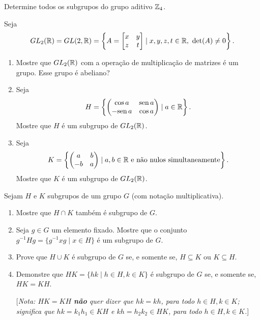 \documentclass[12pt]{exam}
\begin{document}
    \vspace{.3cm}

    \questao{} Determine todos os subgrupos do grupo aditivo $\mathbb{Z}_4$.

    \vspace{.3cm}

    \questao{} Seja
    \[
    	GL_2(\mathbb{R}) = GL(2, \mathbb{R}) = \left\{A = \begin{bmatrix}x & y\\z & t\end{bmatrix} \mid x, y, z, t \in \mathbb{R},\ \det(A) \ne 0 \right\}.
    \]
    \begin{enumerate}[label=({\alph*})]
      \item Mostre que $GL_2(\mathbb{R})$ com a opera\c{c}\~ao de multiplica\c{c}\~ao de matrizes \'e um grupo. Esse grupo \'e abeliano?

      \item Seja
      \[
          H = \left\{ \begin{pmatrix}
              \cos a & {\rm sen\,} a\\ - {\rm sen\,} a & \cos a
          \end{pmatrix} \mid a \in \mathbb{R}\right\}.
      \]
      Mostre que $H$ \'e um subgrupo de $GL_2(\mathbb{R})$.

      \item Seja
      \[
          K = \left\{ \begin{pmatrix}
              a & b\\ -b & a
          \end{pmatrix} \mid a, b \in \mathbb{R} \mbox{ e n\~ao nulos simultaneamente}\right\}.
      \]
      Mostre que $K$ \'e um subgrupo de $GL_2(\mathbb{R})$.
    \end{enumerate}

    \questao{} Sejam $H$ e $K$ subgrupos de um grupo $G$ (com nota{\c c}{\~a}o
    multiplicativa).
    \begin{enumerate}[label=({\alph*})]
      \item Mostre que $H\cap K$ tamb{\'e}m {\'e} subgrupo de $G$.

      \item Seja $g\in G$ um elemento fixado. Mostre que o conjunto
      $g^{-1}Hg=\{ g^{-1}xg \mid x\in H \} $ {\'e} um subgrupo de $G$.

      \item Prove que $H\cup K$ {\'e} subgrupo de $G$ se, e somente se,
      $H\subseteq K$ ou $K\subseteq H$.

      \item Demonstre que $HK=\{hk \mid h\in H, k\in K\}$ {\'e} subgrupo
      de $G$ se, e somente se, $HK=KH$.

      [\emph{Nota: $HK=KH$ \textbf{n{\~a}o} quer dizer que $hk=kh$,
      para todo $h\in H, k\in K$; significa que $hk=k_1h_1 \in KH$ e $kh=h_2k_2 \in
      HK$, para todo $h\in H, k\in K$.}]
    \end{enumerate}
\end{document}
